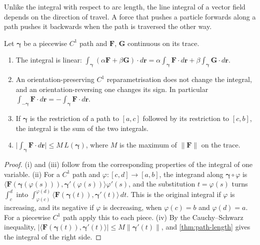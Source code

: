 Unlike the integral with respect to arc length, the line integral of a vector field depends on the direction of travel. A force that pushes a particle forwards along a path pushes it backwards when the path is traversed the other way.

\begin{proposition}
\label{prop:line-integral-properties}
Let $\boldsymbol\gamma$ be a piecewise $C^1$ path and $\mathbf F$, $\mathbf G$ continuous on its trace.
\begin{enumerate}
\item The integral is linear: $\int_{\boldsymbol\gamma}(\alpha\mathbf F+\beta\mathbf G)\cdot d\mathbf r=\alpha\int_{\boldsymbol\gamma}\mathbf F\cdot d\mathbf r+\beta\int_{\boldsymbol\gamma}\mathbf G\cdot d\mathbf r$.
\item An orientation-preserving $C^1$ reparametrisation does not change the integral, and an orientation-reversing one changes its sign. In particular $\int_{-\boldsymbol\gamma}\mathbf F\cdot d\mathbf r=-\int_{\boldsymbol\gamma}\mathbf F\cdot d\mathbf r$.
\item If $\boldsymbol\gamma$ is the restriction of a path to $[a,c]$ followed by its restriction to $[c,b]$, the integral is the sum of the two integrals.
\item $\bigl|\int_{\boldsymbol\gamma}\mathbf F\cdot d\mathbf r\bigr|\le M\,L(\boldsymbol\gamma)$, where $M$ is the maximum of $\|\mathbf F\|$ on the trace.
\end{enumerate}
\end{proposition}

\begin{proof}
(i) and (iii) follow from the corresponding properties of the integral of one variable. (ii) For a $C^1$ path and $\varphi\colon[c,d]\to[a,b]$, the integrand along $\boldsymbol\gamma\circ\varphi$ is $\langle\mathbf F(\boldsymbol\gamma(\varphi(s))),\boldsymbol\gamma'(\varphi(s))\rangle\varphi'(s)$, and the substitution $t=\varphi(s)$ turns $\int_c^d$ into $\int_{\varphi(c)}^{\varphi(d)}\langle\mathbf F(\boldsymbol\gamma(t)),\boldsymbol\gamma'(t)\rangle\,dt$. This is the original integral if $\varphi$ is increasing, and its negative if $\varphi$ is decreasing, when $\varphi(c)=b$ and $\varphi(d)=a$. For a piecewise $C^1$ path apply this to each piece. (iv) By the Cauchy--Schwarz inequality, $|\langle\mathbf F(\boldsymbol\gamma(t)),\boldsymbol\gamma'(t)\rangle|\le M\|\boldsymbol\gamma'(t)\|$, and \cref{thm:path-length} gives the integral of the right side.
\end{proof}

